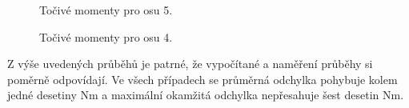 \begin{figure}[!h]
  \centering
  \hfill
  \caption{Točivé momenty pro osu 5.}
  \label{osa5_prub}
\end{figure}
\newpage

\begin{figure}[!h]
  \centering
  \hfill
  \caption{Točivé momenty pro osu 4.}
  \label{osa4_prub}
\end{figure}

Z výše uvedených průběhů je patrné, že vypočítané a naměření průběhy si poměrně odpovídají. Ve všech případech se průměrná odchylka pohybuje kolem jedné desetiny Nm a maximální okamžitá odchylka nepřesahuje šest desetin Nm. 

 
